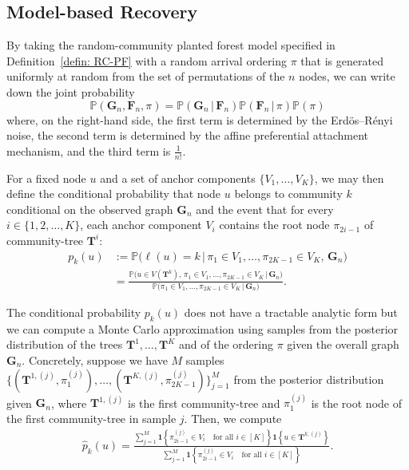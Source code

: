 \documentclass[twoside,11pt]{article}
\theoremstyle{remark}
\begin{document}
\subsection{Model-based Recovery}
\label{sec: model-based recovery}
By taking the random-community planted forest model specified in Definition~\ref{defin: RC-PF} with a random arrival ordering $\pi$ that is generated uniformly at random from the set of permutations of the $n$ nodes, we can write down the joint probability
\[
\mathbb{P}(\bm{G}_n, \bm{F}_n, \pi) = \mathbb{P}(\bm{G}_n \,|\, \bm{F}_n) \mathbb{P}(\bm{F}_n \,|\, \pi) \mathbb{P}(\pi)
\]
where, on the right-hand side, the first term is determined by the Erd\"{o}s--R\'{e}nyi noise, the second term is determined by the affine preferential attachment mechanism, and the third term is $\frac{1}{n!}$. 

For a fixed node $u$ and a set of anchor components $\{V_1, \ldots, V_K\}$, we may then define the conditional probability that node $u$ belongs to community $k$ conditional on the observed graph $\bm{G}_n$ and the event that for every $i \in \{1, 2, \ldots, K\}$, each anchor component $V_i$ contains the root node $\pi_{2i-1}$ of community-tree $\bm{T}^i$:
\begin{align*}
p_k(u) &:= \mathbb{P}\bigl( \ell(u) = k \,\big|\, \pi_1 \in V_1, \ldots, \pi_{2K-1} \in V_K, \, \bm{G}_n \bigr) \\
&= \frac{ \mathbb{P}\bigl( u \in V(\bm{T}^k), \, \pi_1 \in V_1, \ldots, \pi_{2K-1} \in V_K  \,\big|\, \bm{G}_n \bigr) }{
\mathbb{P}\bigl( \pi_1 \in V_1, \ldots, \pi_{2K-1} \in V_K \, \big|\, \bm{G}_n \bigr)}.
\end{align*}

The conditional probability $p_k(u)$ does not have a tractable analytic form but we can compute a Monte Carlo approximation using samples from the posterior distribution of the trees $\bm{T}^1, \ldots, \bm{T}^K$ and of the ordering $\pi$ given the overall graph $\bm{G}_n$. Concretely, suppose we have $M$ samples $\{( \bm{T}^{1, (j)}, \pi_1^{(j)}), \ldots, (\bm{T}^{K, (j)}, \pi_{2K-1}^{(j)})\}_{j=1}^M$ from the posterior distribution given $\bm{G}_n$, where $\bm{T}^{1, (j)}$ is the first community-tree and $\pi_1^{(j)}$ is the root node of the first community-tree in sample $j$. Then, we compute
\begin{align*}
\hat{p}_k(u) = \frac{\sum_{j=1}^M \mathbf{1}\left\{\pi^{(j)}_{2i-1} \in V_i \quad \text{for all $i\in \left[K\right]$}\right\} \mathbf{1}\left\{u \in \bm{T}^{k, (j)}\right\}}{\sum_{j=1}^M \mathbf{1}\left\{\pi^{(j)}_{2i-1} \in V_i \quad \text{for all $i\in \left[K\right]$}\right\}}.
\end{align*}
\end{document}
